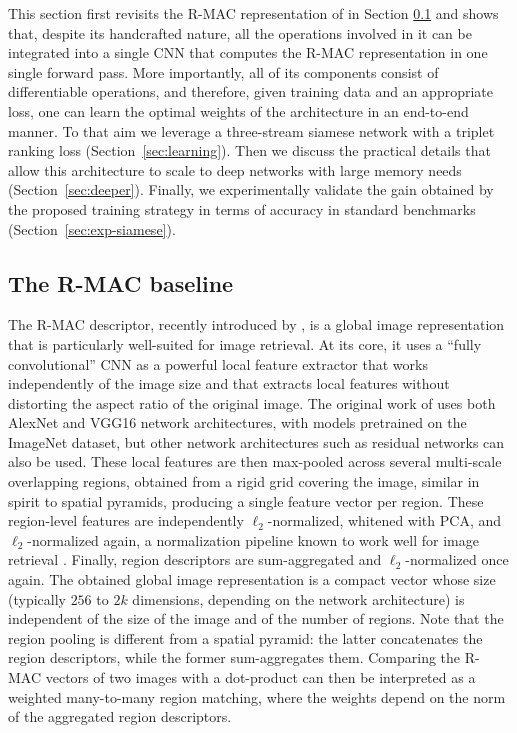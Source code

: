 \documentclass[twocolumn]{svjour3}          \smartqed  \usepackage{graphicx}
\begin{document}
This section first revisits the R-MAC representation of \cite{Tolias2016} in Section \ref{sec:r-mac} and shows that, despite its handcrafted nature, all the operations involved in it can be integrated into a single CNN that computes the R-MAC representation in one single forward pass. 
More importantly, all of its components consist of differentiable operations, and therefore, given training data and an appropriate loss, one can learn the optimal weights of the architecture in an end-to-end manner.
To that aim we leverage a three-stream siamese network with a triplet ranking loss (Section~\ref{sec:learning}).
Then we discuss the practical details that allow this architecture to scale to deep networks with large memory needs (Section~\ref{sec:deeper}).
Finally, we experimentally validate the gain obtained by the proposed training strategy in terms of accuracy in standard benchmarks (Section~\ref{sec:exp-siamese}).

\subsection{The R-MAC baseline}
\label{sec:r-mac}

The R-MAC descriptor, recently introduced by \cite{Tolias2016}, is
a global image representation that is particularly well-suited for image retrieval.
At its core, it uses a ``fully convolutional'' CNN as a powerful local feature extractor that works independently of the image size and that extracts local features without distorting the aspect ratio of the original image.
The original work of \cite{Tolias2016} uses both AlexNet \citep{Krizhevsky2012} and VGG16 \citep{Simonyan2015verydeep} network architectures, with models pretrained on the ImageNet dataset, but other network architectures such as residual networks \citep{He2016} can also be used.
These local features are then max-pooled across several multi-scale overlapping regions, obtained from a rigid grid covering the image, similar in spirit to spatial pyramids, producing a single feature vector per region.
These region-level features are independently $\ell_2$-normalized, whitened with PCA, and $\ell_2$-normalized again, a normalization pipeline known to work well for image retrieval \citep{Jegou2012}.
Finally, region descriptors are sum-aggregated and $\ell_2$-normalized once again.
The obtained global image representation is a compact vector whose size (typically $256$ to $2k$ dimensions, depending on the network architecture) is independent of the size of the image and of the number of regions.
Note that the region pooling is different from a spatial pyramid: the latter concatenates the region descriptors, while the former sum-aggregates them.
Comparing the R-MAC vectors of two images with a dot-product can then be interpreted as a weighted many-to-many region matching, where the weights depend on the norm of the aggregated region descriptors.
\end{document}
